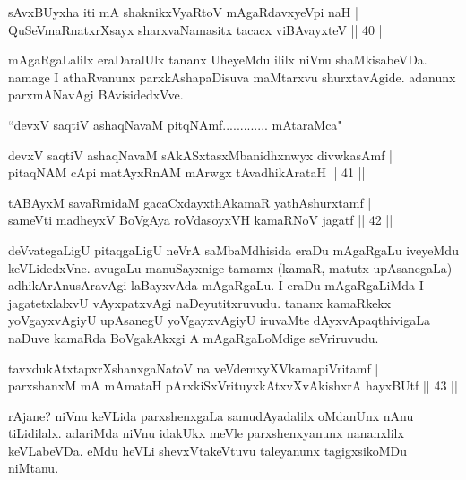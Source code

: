 
\begin{shl}
sAvxBUyxha iti mA shaknikxVyaRtoV mAgaRdavxyeV\s pi naH | \\
QuSeVmaRnatxrXsayx sharxvaNamasitx tacacx viBAvayxteV \hfill|| 40 || 
\end{shl}

\begin{artha}
mAgaRgaLalilx eraDaralUlx tananx UheyeMdu ililx niVnu shaMkisabeVDa. 
namage I athaRvanunx parxkAshapaDisuva maMtarxvu shurxtavAgide. 
adanunx parxmANavAgi BAvisidedxVve.
\end{artha}


\begin{shl}
``devxV saqtiV ashaqNavaM pitqNAmf............. mAtaraMca"
\end{shl}


\begin{shl}
devxV saqtiV ashaqNavaM sAkASxtasxMbanidhxnwyx divwkasAmf | \\
pitaqNAM cApi matAyxRnAM mArwgx tAvadhikArataH \hfill|| 41 || 
\end{shl}

\begin{shl}
tABAyxM savaRmidaM gacaCxdayxthAkamaR yathAshurxtamf | \\
sameVti madheyxV BoVgAya roVdasoyxVH kamaRNoV jagatf \hfill|| 42 || 
\end{shl}

\begin{artha}
deVvategaLigU pitaqgaLigU neVrA saMbaMdhisida eraDu mAgaRgaLu iveyeMdu 
keVLidedxVne. avugaLu manuSayxnige tamamx (kamaR, matutx upAsanegaLa) 
adhikArAnusAravAgi laBayxvAda mAgaRgaLu. I eraDu mAgaRgaLiMda I 
jagatetxlalxvU vAyxpatxvAgi naDeyutitxruvudu. tananx kamaRkekx 
yoVgayxvAgiyU upAsanegU yoVgayxvAgiyU iruvaMte dAyxvApaqthivigaLa 
naDuve kamaRda BoVgakAkxgi A mAgaRgaLoMdige seVriruvudu.
\end{artha}

\begin{shl}
tavxdukAtxtapxrXshanxgaNatoV na veVdemxyXVkamapiVritamf | \\
parxshanxM mA mAmataH pArxkiSxVrituyxkAtxvX\s vAkishxrA hayxBUtf \hfill|| 43 || 
\end{shl}

\begin{artha}
rAjane? niVnu keVLida parxshenxgaLa samudAyadalilx oMdanUnx nAnu 
tiLidilalx. adariMda niVnu idakUkx meVle parxshenxyanunx nananxlilx 
keVLabeVDa. eMdu heVLi shevxVtakeVtuvu taleyanunx tagigxsikoMDu 
niMtanu.
\end{artha}

